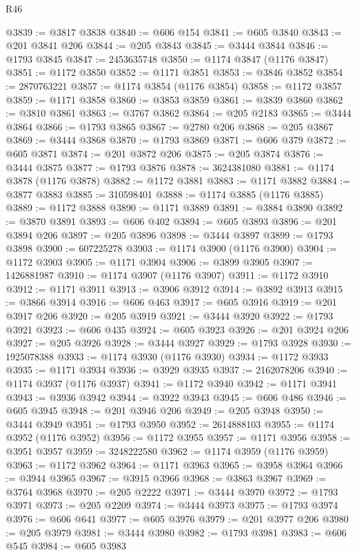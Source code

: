 \begin{lexlean}{R46}
\begin{coremodule}
@3839 := @3817 @3838
@3840 := @606 @154
@3841 := @605 @3840
@3843 := @201 @3841 @206
@3844 := @205 @3843
@3845 := @3444 @3844
@3846 := @1793 @3845
@3847 := 2453635748
@3850 := @1174 @3847 (@1176 @3847)
@3851 := @1172 @3850
@3852 := @1171 @3851
@3853 := @3846 @3852
@3854 := 2870763221
@3857 := @1174 @3854 (@1176 @3854)
@3858 := @1172 @3857
@3859 := @1171 @3858
@3860 := @3853 @3859
@3861 := @3839 @3860
@3862 := @3810 @3861
@3863 := @3767 @3862
@3864 := @205 @2183
@3865 := @3444 @3864
@3866 := @1793 @3865
@3867 := @2780 @206
@3868 := @205 @3867
@3869 := @3444 @3868
@3870 := @1793 @3869
@3871 := @606 @379
@3872 := @605 @3871
@3874 := @201 @3872 @206
@3875 := @205 @3874
@3876 := @3444 @3875
@3877 := @1793 @3876
@3878 := 3624381080
@3881 := @1174 @3878 (@1176 @3878)
@3882 := @1172 @3881
@3883 := @1171 @3882
@3884 := @3877 @3883
@3885 := 310598401
@3888 := @1174 @3885 (@1176 @3885)
@3889 := @1172 @3888
@3890 := @1171 @3889
@3891 := @3884 @3890
@3892 := @3870 @3891
@3893 := @606 @402
@3894 := @605 @3893
@3896 := @201 @3894 @206
@3897 := @205 @3896
@3898 := @3444 @3897
@3899 := @1793 @3898
@3900 := 607225278
@3903 := @1174 @3900 (@1176 @3900)
@3904 := @1172 @3903
@3905 := @1171 @3904
@3906 := @3899 @3905
@3907 := 1426881987
@3910 := @1174 @3907 (@1176 @3907)
@3911 := @1172 @3910
@3912 := @1171 @3911
@3913 := @3906 @3912
@3914 := @3892 @3913
@3915 := @3866 @3914
@3916 := @606 @463
@3917 := @605 @3916
@3919 := @201 @3917 @206
@3920 := @205 @3919
@3921 := @3444 @3920
@3922 := @1793 @3921
@3923 := @606 @435
@3924 := @605 @3923
@3926 := @201 @3924 @206
@3927 := @205 @3926
@3928 := @3444 @3927
@3929 := @1793 @3928
@3930 := 1925078388
@3933 := @1174 @3930 (@1176 @3930)
@3934 := @1172 @3933
@3935 := @1171 @3934
@3936 := @3929 @3935
@3937 := 2162078206
@3940 := @1174 @3937 (@1176 @3937)
@3941 := @1172 @3940
@3942 := @1171 @3941
@3943 := @3936 @3942
@3944 := @3922 @3943
@3945 := @606 @486
@3946 := @605 @3945
@3948 := @201 @3946 @206
@3949 := @205 @3948
@3950 := @3444 @3949
@3951 := @1793 @3950
@3952 := 2614888103
@3955 := @1174 @3952 (@1176 @3952)
@3956 := @1172 @3955
@3957 := @1171 @3956
@3958 := @3951 @3957
@3959 := 3248222580
@3962 := @1174 @3959 (@1176 @3959)
@3963 := @1172 @3962
@3964 := @1171 @3963
@3965 := @3958 @3964
@3966 := @3944 @3965
@3967 := @3915 @3966
@3968 := @3863 @3967
@3969 := @3764 @3968
@3970 := @205 @2222
@3971 := @3444 @3970
@3972 := @1793 @3971
@3973 := @205 @2209
@3974 := @3444 @3973
@3975 := @1793 @3974
@3976 := @606 @641
@3977 := @605 @3976
@3979 := @201 @3977 @206
@3980 := @205 @3979
@3981 := @3444 @3980
@3982 := @1793 @3981
@3983 := @606 @545
@3984 := @605 @3983

\end{coremodule}
\end{lexlean}
